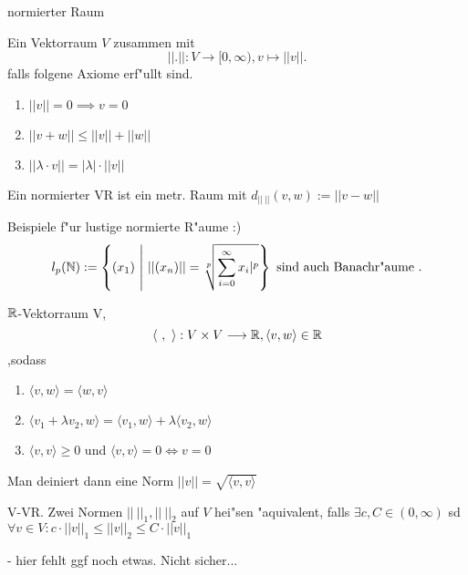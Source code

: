 \documentclass[class=article, crop=false]{standalone}
\begin{document}
\begin{zettel}{normierter Raum}
\begin{flashcard}[]{}
	\begin{definition}
		Ein Vektorraum $V$ zusammen mit
		\[
			|| . ||: V \longrightarrow [0, \infty), v \mapsto  ||v||
		.\]
		falls folgene Axiome erf"ullt sind.
		\begin{enumerate}
			\item $||v|| = 0 \implies v = 0 $
			\item $||v + w || \leq  ||v|| + ||w||$
			\item $||\lambda \cdot v|| = |\lambda | \cdot ||v||$
		\end{enumerate}
	\end{definition}
	Ein normierter VR ist ein metr. Raum mit $ d_{ ||\ ||} (v,w) := ||v -w||$
\end{flashcard}

\begin{remark}
	Beispiele f"ur lustige normierte R"aume :)
	\[
		l_p (\mathbb{N}) := \set{ (x_1 )}{ ||(x_n)|| = \sqrt[p]{\sum_{i=0}^{\infty}
				x_i|^p}  } \text{ sind auch Banachr"aume }
	.\]

	\begin{example}[Hilbertraum?]
		$\mathbb{R}$-Vektorraum V,
		\[
			\langle \ , \ \rangle : V \times V \longrightarrow \mathbb{R}, \langle v,w\rangle \in  \mathbb{R}
		\] ,sodass
		\begin{enumerate}
			\item $ \langle v,w\rangle  =  \langle w,v\rangle $
			\item $ \langle v_1+\lambda v_2,w\rangle =  \langle v_1 ,w\rangle  + \lambda \langle v_2,w\rangle $
			\item $ \langle v,v\rangle \geq 0$ und $ \langle v,v\rangle = 0 \iff  v = 0$

		\end{enumerate}
		Man deiniert dann eine Norm $||v|| = \sqrt{ \langle v,v\rangle }$

	\end{example}
\end{remark}

\begin{definition}
	V-VR. Zwei Normen $||\ ||_1, ||\ ||_2 $ auf $V$ hei"sen "aquivalent, falls $\exists c, C \in  (0,\infty) $ sd
	$\forall  v \in  V : c \cdot  ||v||_1 \leq ||v||_2 \leq C \cdot ||v||_1$

	- hier fehlt ggf noch etwas. Nicht sicher...
\end{definition}
\end{zettel}
\end{document}
